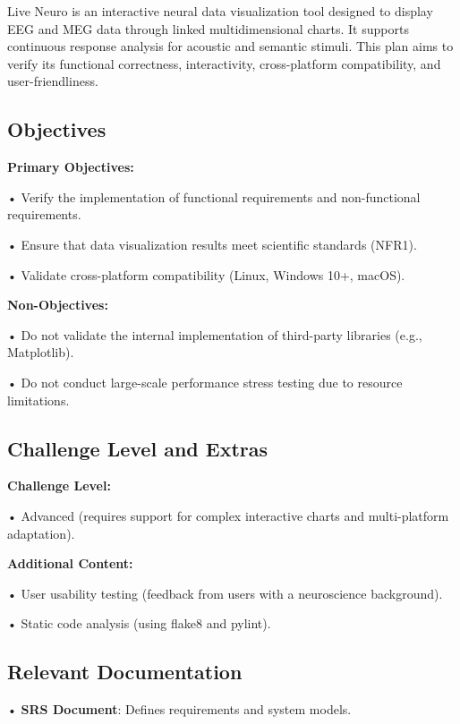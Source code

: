 \documentclass[
]{article}
\begin{document}
Live Neuro is an interactive neural data visualization tool designed to
display EEG and MEG data through linked multidimensional charts. It
supports continuous response analysis for acoustic and semantic stimuli.
This plan aims to verify its functional correctness, interactivity,
cross-platform compatibility, and user-friendliness.

\hypertarget{objectives}{%
\subsection{Objectives}\label{objectives}}

\textbf{Primary Objectives:}

• Verify the implementation of functional requirements and
non-functional requirements.

• Ensure that data visualization results meet scientific standards
(NFR1).

• Validate cross-platform compatibility (Linux, Windows 10+, macOS).

\textbf{Non-Objectives:}

• Do not validate the internal implementation of third-party libraries
(e.g., Matplotlib).

• Do not conduct large-scale performance stress testing due to resource
limitations.

\hypertarget{challenge-level-and-extras}{%
\subsection{Challenge Level and
Extras}\label{challenge-level-and-extras}}

\textbf{Challenge Level:}

• Advanced (requires support for complex interactive charts and
multi-platform adaptation).

\textbf{Additional Content:}

• User usability testing (feedback from users with a neuroscience
background).

• Static code analysis (using flake8 and pylint).

\hypertarget{relevant-documentation}{%
\subsection{Relevant Documentation}\label{relevant-documentation}}

• \textbf{SRS Document}: Defines requirements and system models.
\end{document}
